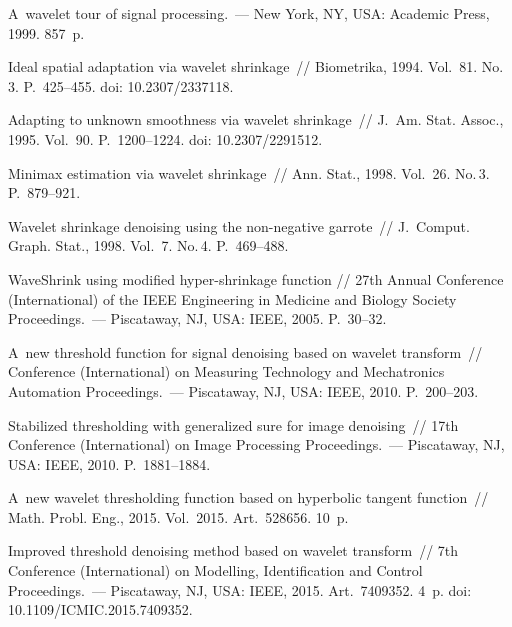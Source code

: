 \begin{multicols}{2}
{{\begin{thebibliography}{99}
 A~wavelet tour of signal processing.~--- New York, NY, USA: 
Academic Press, 1999. 857~p.

 Ideal spatial adaptation via wavelet 
shrinkage~// Biometrika, 1994. Vol.~81. No.\,3.
P.~425--455. doi: 10.2307/2337118.

 Adapting to unknown smoothness via wavelet 
shrinkage~// J.~Am. Stat. Assoc., 1995. Vol.~90. P.~1200--1224. doi: 10.2307/2291512.

 Minimax estimation via wavelet shrinkage~// 
Ann. Stat., 1998. Vol.~26. No.\,3. P.~879--921.

 Wavelet shrinkage denoising using the non-negative garrote~// 
J.~Comput. Graph. Stat., 1998. Vol.~7. No.\,4. P.~469--488.

WaveShrink using modified hyper-shrinkage function // 27th Annual Conference (International) 
 of the IEEE Engineering in Medicine and Biology Society Proceedings.~--- Piscataway, NJ, USA: IEEE, 2005. P.~30--32.

 A~new threshold function for signal denoising based on 
wavelet transform~// Conference (International) on Measuring Technology and Mechatronics Automation Proceedings.~--- 
Piscataway, NJ, USA: IEEE, 2010. P.~200--203.

 Stabilized thresholding with generalized sure 
for image denoising~// 17th Conference (International) on Image Processing Proceedings.~--- Piscataway, NJ, USA: IEEE, 2010. P.~1881--1884.

 A~new wavelet thresholding 
function based on hyperbolic tangent function~// Math. Probl. 
Eng., 2015. Vol.~2015. Art.~528656. 10~p.

 Improved threshold denoising method based on 
wavelet transform~// 7th  Conference (International) on 
Modelling, Identification and Control Proceedings.~--- Piscataway, NJ, USA: 
IEEE, 2015. Art.~7409352. 4~p. doi: 10.1109/ICMIC.2015.7409352.
\end{thebibliography}

 }
 }

\end{multicols}

